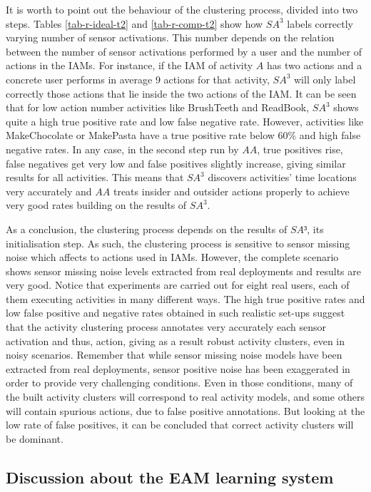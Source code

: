It is worth to point out the behaviour of the clustering process, divided into two steps. Tables \ref{tab-r-ideal-t2} and \ref{tab-r-comp-t2} show how $SA^3$ labels correctly varying number of sensor activations. This number depends on the relation between the number of sensor activations performed by a user and the number of actions in the IAMs. For instance, if the IAM of activity $A$ has two actions and a concrete user performs in average 9 actions for that activity, $SA^3$ will only label correctly those actions that lie inside the two actions of the IAM. It can be seen that for low action number activities like BrushTeeth and ReadBook, $SA^3$ shows quite a high true positive rate and low false negative rate. However, activities like MakeChocolate or MakePasta have a true positive rate below 60\% and high false negative rates. In any case, in the second step run by $AA$, true positives rise, false negatives get very low and false positives slightly increase, giving similar results for all activities. This means that $SA^3$ discovers activities' time locations very accurately and $AA$ treats insider and outsider actions properly to achieve very good rates building on the results of $SA^3$.

As a conclusion, the clustering process depends on the results of $SA³$, its initialisation step. As such, the clustering process is sensitive to sensor missing noise which affects to actions used in IAMs. However, the complete scenario shows sensor missing noise levels extracted from real deployments and results are very good. Notice that experiments are carried out for eight real users, each of them executing activities in many different ways. The high true positive rates and low false positive and negative rates obtained in such realistic set-ups suggest that the activity clustering process annotates very accurately each sensor activation and thus, action, giving as a result robust activity clusters, even in noisy scenarios. Remember that while sensor missing noise models have been extracted from real deployments, sensor positive noise has been exaggerated in order to provide very challenging conditions. Even in those conditions, many of the built activity clusters will correspond to real activity models, and some others will contain spurious actions, due to false positive annotations. But looking at the low rate of false positives, it can be concluded that correct activity clusters will be dominant. 

\subsection{Discussion about the EAM learning system}

